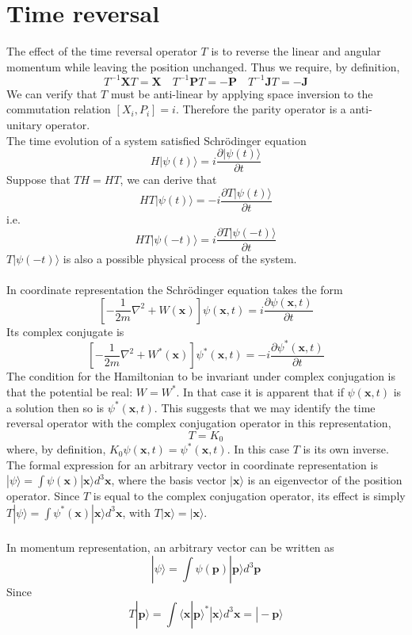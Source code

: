 \section{Time reversal}
The effect of the time reversal operator $T$ is to reverse the linear and angular momentum while leaving the position unchanged. Thus we require, by definition,
\[T^{-1}\bm{X}T = \bm{X} \quad T^{-1}\bm{P}T = -\bm{P} \quad T^{-1}\bm{J}T = -\bm{J}\]
We can verify that $T$ must be anti-linear by applying space inversion to the commutation relation $[X_i,P_i] = i$. Therefore the parity operator is a anti-unitary operator.\\
The time evolution of a system satisfied Schrödinger equation
\[H|\psi(t)\rangle = i\frac{\partial |\psi(t)\rangle }{\partial t}\]
Suppose that $TH=HT$, we can derive that
\[HT|\psi(t)\rangle = -i\frac{\partial T|\psi(t)\rangle }{\partial t}\]
i.e.
\[HT|\psi(-t)\rangle = i\frac{\partial T|\psi(-t)\rangle }{\partial t}\]
$T|\psi(-t)\rangle$ is also a possible physical process of the system.\\ \\
In coordinate representation the Schrödinger equation takes the form
\[ \left[ -\frac{1}{2m}\nabla^2 + W(\bm{x}) \right] \psi(\bm{x},t) = i\frac{\partial \psi(\bm{x},t)}{\partial t}\]
Its complex conjugate is
\[ \left[ -\frac{1}{2m}\nabla^2 + W^*(\bm{x}) \right] \psi^*(\bm{x},t) = -i\frac{\partial \psi^*(\bm{x},t)}{\partial t}\]
The condition for the Hamiltonian to be invariant under complex conjugation is that the potential be real: $W=W^*$. In that case it is apparent that if $\psi(\bm{x},t)$ is a solution then so is  $\psi^*(\bm{x},t)$. This suggests that we may identify the time reversal operator with the complex conjugation operator in this representation,
\[T = K_0\]
where, by definition, $K_0\psi(\bm{x},t) = \psi^*(\bm{x},t)$. In this case $T$ is its own inverse. 
The formal expression for an arbitrary vector in coordinate representation is $|\psi\rangle = \int \psi(\bm{x})|\bm{x}\rangle d^3 \bm{x}$, where the basis vector $|\bm{x}\rangle$ is an eigenvector of the position operator. Since $T$ is equal to the complex conjugation operator, its effect is simply $T|\psi\rangle = \int \psi^*(\bm{x})|\bm{x}\rangle d^3 \bm{x}$, with $T|\bm{x}\rangle = |\bm{x}\rangle$.\\ \\
In momentum representation, an arbitrary vector can be written as
\[|\psi\rangle = \int \psi(\bm{p})|\bm{p}\rangle d^3 \bm{p}\]
Since
\[T|\bm{p}\rangle = \int \langle \bm{x} | \bm{p}\rangle^* |
\bm{x}\rangle d^3 \bm{x} = |-\bm{p}\rangle\]
